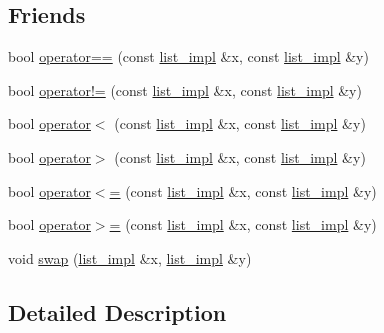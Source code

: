 \subsection*{Friends}
\begin{DoxyCompactItemize}
\item 
bool \hyperlink{classboost_1_1intrusive_1_1list__impl_adfa112438fc1b811ec128a07af699c94}{operator==} (const \hyperlink{classboost_1_1intrusive_1_1list__impl}{list\+\_\+impl} \&x, const \hyperlink{classboost_1_1intrusive_1_1list__impl}{list\+\_\+impl} \&y)
\item 
bool \hyperlink{classboost_1_1intrusive_1_1list__impl_ad1f3207f2a89bfb5ee38f1cd6114bf94}{operator!=} (const \hyperlink{classboost_1_1intrusive_1_1list__impl}{list\+\_\+impl} \&x, const \hyperlink{classboost_1_1intrusive_1_1list__impl}{list\+\_\+impl} \&y)
\item 
bool \hyperlink{classboost_1_1intrusive_1_1list__impl_aca2da5db0e59cc4aa259b748d571516a}{operator$<$} (const \hyperlink{classboost_1_1intrusive_1_1list__impl}{list\+\_\+impl} \&x, const \hyperlink{classboost_1_1intrusive_1_1list__impl}{list\+\_\+impl} \&y)
\item 
bool \hyperlink{classboost_1_1intrusive_1_1list__impl_aa53995779f3115d3d6283176ae2e5879}{operator$>$} (const \hyperlink{classboost_1_1intrusive_1_1list__impl}{list\+\_\+impl} \&x, const \hyperlink{classboost_1_1intrusive_1_1list__impl}{list\+\_\+impl} \&y)
\item 
bool \hyperlink{classboost_1_1intrusive_1_1list__impl_a7efc3d66080937cc7b391259f3a755df}{operator$<$=} (const \hyperlink{classboost_1_1intrusive_1_1list__impl}{list\+\_\+impl} \&x, const \hyperlink{classboost_1_1intrusive_1_1list__impl}{list\+\_\+impl} \&y)
\item 
bool \hyperlink{classboost_1_1intrusive_1_1list__impl_a377468145b0d37be0290b44223a82d14}{operator$>$=} (const \hyperlink{classboost_1_1intrusive_1_1list__impl}{list\+\_\+impl} \&x, const \hyperlink{classboost_1_1intrusive_1_1list__impl}{list\+\_\+impl} \&y)
\item 
void \hyperlink{classboost_1_1intrusive_1_1list__impl_ab912cfb4f0b466441be2a187fbe40c04}{swap} (\hyperlink{classboost_1_1intrusive_1_1list__impl}{list\+\_\+impl} \&x, \hyperlink{classboost_1_1intrusive_1_1list__impl}{list\+\_\+impl} \&y)
\end{DoxyCompactItemize}


\subsection{Detailed Description}
